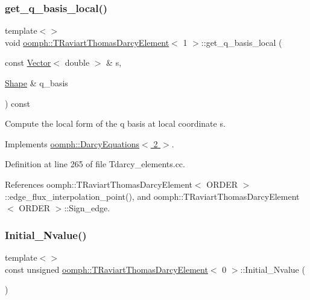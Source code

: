\subsubsection{\texorpdfstring{get\+\_\+q\+\_\+basis\+\_\+local()}{get\_q\_basis\_local()}\hspace{0.1cm}{\footnotesize\ttfamily [3/3]}}
{\footnotesize\ttfamily template$<$$>$ \\
void \hyperlink{classoomph_1_1TRaviartThomasDarcyElement}{oomph\+::\+T\+Raviart\+Thomas\+Darcy\+Element}$<$ 1 $>$\+::get\+\_\+q\+\_\+basis\+\_\+local (\begin{DoxyParamCaption}\item[{const \hyperlink{classoomph_1_1Vector}{Vector}$<$ double $>$ \&}]{s,  }\item[{\hyperlink{classoomph_1_1Shape}{Shape} \&}]{q\+\_\+basis }\end{DoxyParamCaption}) const\hspace{0.3cm}{\ttfamily [virtual]}}



Compute the local form of the q basis at local coordinate s. 



Implements \hyperlink{classoomph_1_1DarcyEquations_ae4098060d7311ceab8ad7673876f070c}{oomph\+::\+Darcy\+Equations$<$ 2 $>$}.



Definition at line 265 of file Tdarcy\+\_\+elements.\+cc.



References oomph\+::\+T\+Raviart\+Thomas\+Darcy\+Element$<$ O\+R\+D\+E\+R $>$\+::edge\+\_\+flux\+\_\+interpolation\+\_\+point(), and oomph\+::\+T\+Raviart\+Thomas\+Darcy\+Element$<$ O\+R\+D\+E\+R $>$\+::\+Sign\+\_\+edge.

\mbox{\label{classoomph_1_1TRaviartThomasDarcyElement_a4d20b781abfaec84f0333b4d2d0689f9}} 
\subsubsection{\texorpdfstring{Initial\+\_\+\+Nvalue()}{Initial\_Nvalue()}\hspace{0.1cm}{\footnotesize\ttfamily [1/2]}}
{\footnotesize\ttfamily template$<$$>$ \\
const unsigned \hyperlink{classoomph_1_1TRaviartThomasDarcyElement}{oomph\+::\+T\+Raviart\+Thomas\+Darcy\+Element}$<$ 0 $>$\+::Initial\+\_\+\+Nvalue (\begin{DoxyParamCaption}{ }\end{DoxyParamCaption})\hspace{0.3cm}{\ttfamily [protected]}}


